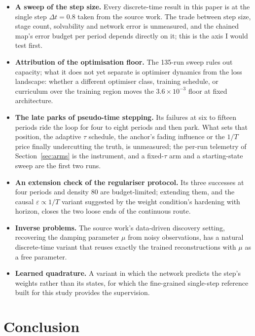 \documentclass[11pt,a4paper]{article}
\begin{document}
\begin{itemize}
  \item \textbf{A sweep of the step size.} Every discrete-time result in
  this paper is at the single step $\Delta t = 0.8$ taken from the
  source work. The trade between step size, stage count, solvability and
  network error is unmeasured, and the chained map's error budget per
  period depends directly on it; this is the axis I would test first.
  \item \textbf{Attribution of the optimisation floor.} The 135-run sweep
  rules out capacity; what it does not yet separate is optimiser dynamics
  from the loss landscape: whether a different optimiser class, training
  schedule, or curriculum over the training region moves the
  $3.6\times10^{-3}$ floor at fixed architecture.
  \item \textbf{The late parks of pseudo-time stepping.} Its failures at six to fifteen periods ride the loop for four to eight periods and then park. What sets that position, the adaptive $\tau$ schedule, the anchor's fading influence or the $1/T$ price finally undercutting the truth, is unmeasured; the per-run telemetry of Section~\ref{sec:arms} is the instrument, and a fixed-$\tau$ arm and a starting-state sweep are the first two runs.
  \item \textbf{An extension check of the regulariser protocol.} Its three successes at four periods and density 80 are budget-limited; extending them, and the causal $\varepsilon \propto 1/T$ variant suggested by the weight condition's hardening with horizon, closes the two loose ends of the continuous route.
  \item \textbf{Inverse problems.} The source work's data-driven discovery
  setting, recovering the damping parameter $\mu$ from noisy
  observations, has a natural discrete-time variant that reuses exactly
  the trained reconstructions with $\mu$ as a free parameter.
  \item \textbf{Learned quadrature.} A variant in which the network
  predicts the step's weights rather than its states, for which the
  fine-grained single-step reference built for this study provides the
  supervision.
\end{itemize}

\section{Conclusion}
\label{sec:conclusion}
\end{document}
